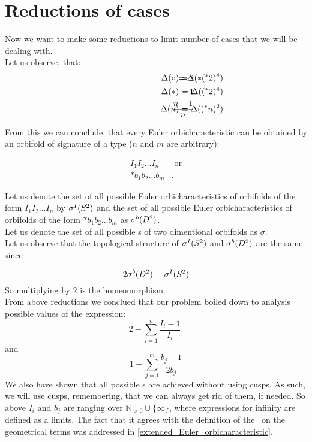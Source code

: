 \section{Reductions of cases}
Now we want to make some reductions to limit number of cases that we will be dealing with. \\
Let us observe, that:
\begin{align*}
\hspace{3cm}\Delta(\circ) =& \hspace{-1cm} &-2& \hspace{-1cm} &= \Delta(*(^*2)^4) \\
\hspace{3cm}\Delta(*) =& \hspace{-1cm} &-1& \hspace{-1cm} &= \Delta((^*2)^4) \\
\hspace{3cm}\Delta(n) =& \hspace{-1cm} &\frac{n-1}{n}& \hspace{-1cm} &= \Delta((^*n)^2)
\end{align*}

From this we can conclude, that every Euler orbicharacteristic can be obtained 
by an orbifold of signature of a type ($n$ and $m$ are arbitrary):

\begin{align*}
I_1I_2\dots I_n & \textrm{\ or} \\
*b_1b_2\dots b_m &.
\end{align*}

Let us denote the set of all possible Euler orbicharacteristics of orbifolds of the form 
$I_1I_2\dots I_n$ by ${\mathcal{\sigma}^I(S^2)}$ and the set 
of all possible Euler orbicharacteristics of orbifolds of the form $*b_1b_2\dots b_m$ 
as ${\mathcal{\sigma}^b(D^2)}$. \\
Let us denote the set of all possible \Eoc s of two dimentional orbifolds as $\sigma$. \\
Let us observe that the topological structure of ${\mathcal{\sigma}^I(S^2)}$ and ${\mathcal{\sigma}^b(D^2)}$ are the same since 

\begin{equation}\label{times_two_fact}
2{\mathcal{\sigma}^b(D^2)}={\mathcal{\sigma}^I(S^2)}
\end{equation}
So multiplying by $2$ is the homeomorphism. \\
From above reductions we conclued that our problem boiled down to analysis possible 
values of the expression:
\begin{equation}
2 - \sum_{i=1}^n \frac{I_i-1}{I_i}. 
\end{equation}
and 
\begin{equation}
1 - \sum_{j=1}^m \frac{b_j-1}{2b_j}
\end{equation}
We also have shown that all possible \Eoc s are achieved without using cusps. As such, we will use 
cusps, remembering, that we can always get rid of them, if needed. So above $I_i$ and $b_j$ 
are ranging over $\mathbb{N}_{>0}\cup \{\infty\}$, where expressions for infinity are defined as 
a limits. The fact that it agrees with the definition of the \Eoc\ on the geometrical terms was 
addressed in \ref{extended_Euler_orbicharacteristic}.  
